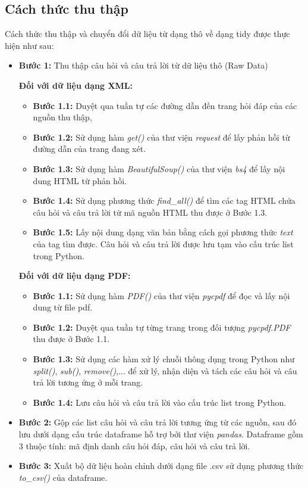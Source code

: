 \documentclass[runningheads]{llncs}
\begin{document}
\subsection{Cách thức thu thập}
Cách thức thu thập và chuyển đổi dữ liệu từ dạng thô về dạng tidy được thực hiện như sau:

\begin{itemize}
\item \textbf{Bước 1:} Thu thập câu hỏi và câu trả lời từ dữ liệu thô (Raw Data)

	\vspace{0.2cm}
	\textbf{Đối với dữ liệu dạng XML:}
	\begin{itemize}
	\item \textbf{Bước 1.1:} Duyệt qua tuần tự các đường dẫn đến trang hỏi đáp của các nguồn thu thập, 
	\item \textbf{Bước 1.2:} Sử dụng hàm \textit{get()} của thư viện \textit{request} để lấy phản hồi từ đường dẫn của trang đang xét.
	\item \textbf{Bước 1.3:} Sử dụng hàm \textit{BeautifulSoup()} của thư viện \textit{bs4} để lấy nội dung HTML từ phản hồi.
	\item \textbf{Bước 1.4:} Sử dụng phương thức \textit{find\_all()} để tìm các tag HTML chứa câu hỏi và câu trả lời từ mã nguồn HTML thu được ở Bước 1.3.
	\item \textbf{Bước 1.5:} Lấy nội dung dạng văn bản bằng cách gọi phương thức \textit{text} của tag tìm được. Câu hỏi và câu trả lời được lưu tạm vào cấu trúc list trong Python.
	\end{itemize}
	
	\vspace{0.2cm}
	\textbf{Đối với dữ liệu dạng PDF:}
	\begin{itemize}
	\item \textbf{Bước 1.1:} Sử dụng hàm \textit{PDF()} của thư viện \textit{pycpdf} để đọc và lấy nội dung từ file pdf.
	\item \textbf{Bước 1.2:} Duyệt qua tuần tự từng trang trong đối tượng \textit{pycpdf.PDF} thu được ở Bước 1.1.
	\item \textbf{Bước 1.3:} Sử dụng các hàm xử lý chuỗi thông dụng trong Python như \textit{split()}, \textit{sub()}, \textit{remove()},... để xử lý, nhận diện và tách các câu hỏi và câu trả lời tương ứng ở mỗi trang.
	\item \textbf{Bước 1.4:}  Lưu câu hỏi và câu trả lời vào cấu trúc list trong Python.
	\end{itemize}
	\vspace{0.2cm}
	\item \textbf{Bước 2:} Gộp các list câu hỏi và câu trả lời tương ứng từ các nguồn, sau đó lưu dưới dạng cấu trúc dataframe hỗ trợ bởi thư viện \textit{pandas}. Dataframe gồm 3 thuộc tính: mã định danh câu hỏi đáp, câu hỏi và câu trả lời.
	\vspace{0.2cm}
	\item \textbf{Bước 3:} Xuất bộ dữ liệu hoàn chỉnh dưới dạng file .csv sử dụng phương thức \textit{to\_csv()} của dataframe.
	


\end{itemize}
\end{document}
